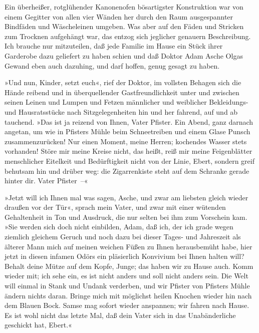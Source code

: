 Ein überheißer, rotglühender Kanonenofen bösartigster Konstruktion
war von einem Gegitter von allen vier Wänden her durch den Raum
ausgespannter Bindfäden und Wäscheleinen umgeben. Was aber auf den
Fäden und Stricken zum Trocknen aufgehängt war, das entzog sich
jeglicher genauern Beschreibung. Ich brauche nur mitzuteilen, daß
jede Familie im Hause ein Stück ihrer Garderobe dazu geliefert zu
haben schien und daß Doktor Adam Asche Olgas Gewand eben auch
dazuhing, und darf hoffen, genug gesagt zu haben.

»Und nun, Kinder, setzt euch«, rief der Doktor, im vollsten Behagen
sich die Hände reibend und in überquellender Gastfreundlichkeit
unter und zwischen seinen Leinen und Lumpen und Fetzen männlicher
und weiblicher Bekleidungs- und Hausratsstücke nach
Sitzgelegenheiten hin und her fahrend, auf und ab tauchend. »Das
ist ja reizend von Ihnen, Vater Pfister. Ein Abend, ganz darnach
angetan, um wie in Pfisters Mühle beim Schneetreiben und einem
Glase Punsch zusammenzurücken! Nur einen Moment, meine Herren;
kochendes Wasser stets vorhanden! Störe mir meine Kreise nicht, das
heißt, reiß mir meine Feigenblätter menschlicher Eitelkeit und
Bedürftigkeit nicht von der Linie, Ebert, sondern greif behutsam
hin und drüber weg: die Zigarrenkiste steht auf dem Schranke gerade
hinter dir. Vater Pfister~–«

»Jetzt will ich Ihnen mal was sagen, Asche, und zwar am liebsten
gleich wieder draußen vor der Tür«, sprach mein Vater, und zwar mit
einer wütenden Gehaltenheit in Ton und Ausdruck, die nur selten bei
ihm zum Vorschein kam. »Sie werden sich doch nicht einbilden, Adam,
daß ich, der ich grade wegen ziemlich gleichem Geruch und noch dazu
bei dieser Tages- und Jahreszeit als älterer Mann mich auf meinen
weichen Füßen zu Ihnen herausbemüht habe, hier jetzt in diesen
infamen Odörs ein pläsierlich Konvivium bei Ihnen halten will?
Behalt deine Mütze auf dem Kopfe, Junge; das haben wir zu Hause
auch. Komm wieder mit; ich sehe ein, es ist nicht anders und soll
nicht anders sein. Die Welt will einmal in Stank und Undank
verderben, und wir Pfister von Pfisters Mühle ändern nichts daran.
Bringe mich mit möglichst heilen Knochen wieder hin nach dem Blauen
Bock. Samse mag sofort wieder anspannen; wir fahren nach Hause. Es
ist wohl nicht das letzte Mal, daß dein Vater sich in das
Unabänderliche geschickt hat, Ebert.«

